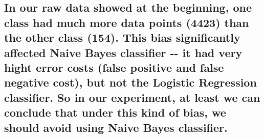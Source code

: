 \documentclass{report}
\begin{document}
\subsection{\texorpdfstring{\textbf{In our raw data showed at the
beginning, one class had much more data points (4423) than the other
class (154). This bias significantly affected Naive Bayes classifier
-\/- it had very hight error costs (false positive and false negative
cost), but not the Logistic Regression classifier. So in our experiment,
at least we can conclude that under this kind of bias, we should avoid
using Naive Bayes
classifier.}}{In our raw data showed at the beginning, one class had much more data points (4423) than the other class (154). This bias significantly affected Naive Bayes classifier -\/- it had very hight error costs (false positive and false negative cost), but not the Logistic Regression classifier. So in our experiment, at least we can conclude that under this kind of bias, we should avoid using Naive Bayes classifier.}}\label{in-our-raw-data-showed-at-the-beginning-one-class-had-much-more-data-points-4423-than-the-other-class-154.-this-bias-significantly-affected-naive-bayes-classifier----it-had-very-hight-error-costs-false-positive-and-false-negative-cost-but-not-the-logistic-regression-classifier.-so-in-our-experiment-at-least-we-can-conclude-that-under-this-kind-of-bias-we-should-avoid-using-naive-bayes-classifier.}


    
    
    
    
\end{document}
